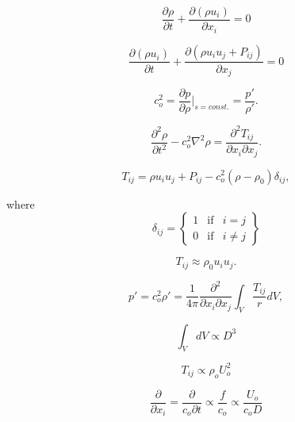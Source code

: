 \begin{equation} \label{eq:1-1}
	\frac{\partial \rho}{\partial t} + \frac{\partial(\rho u_i)}{\partial x_i} = 0
\end{equation}

	\begin{equation} \label{eq:1-2}
		\frac{\partial (\rho u_i)}{\partial t} + \frac{\partial(\rho u_i u_j + P_{ij})}{\partial x_j} = 0
	\end{equation}

\begin{equation}
	c_o^2 = \frac{\partial p}{\partial \rho}|_{s=const.} = \frac{p'}{\rho'}.
\end{equation}

\begin{equation}
\frac{\partial^2 \rho}{\partial t^2} - c_o^2 \nabla^2 \rho = \frac{\partial^2 T_{ij}}{\partial x_i \partial x_j}.
\end{equation}

\begin{equation}
T_{ij} = \rho u_i u_j + P_{ij} - c_o^2(\rho - \rho_0) \delta_{ij},
\end{equation}

where
\begin{equation}
\delta_{ij} = \left\{
\begin{array}{lcr}
1 & \mbox{if} & i = j \\
0 & \mbox{if} & i \neq j
\end{array}
\right\}
\end{equation}

\begin{equation}
T_{ij} \approx \rho_0 u_i u_j.
\end{equation}

\begin{equation}
p' = c_o^2 \rho' = \frac{1}{4\pi} \frac{\partial^2}{\partial x_i \partial x_j} \int_{V} \frac{T_{ij}}{r}dV,
\end{equation}

\begin{equation}
\int_{V} dV \propto D^3
\end{equation}

\begin{equation}
T_{ij} \propto \rho_o U_o^2
\end{equation}

\begin{equation}
\frac{\partial}{\partial x_i} = \frac{\partial}{c_o \partial t} \propto \frac{f}{c_o} \propto \frac{U_o}{c_o D}
\end{equation}

